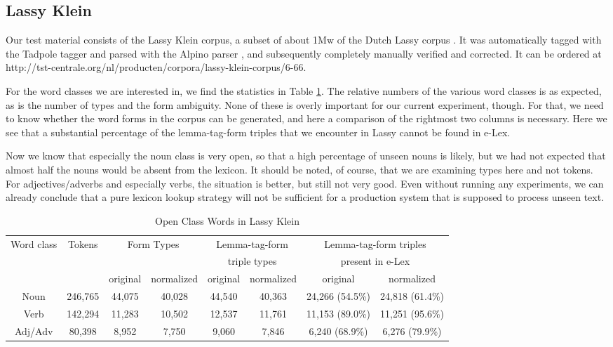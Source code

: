 \documentclass[a4paper,10pt,twoside]{article}
\begin{document}
\subsection{Lassy Klein}
\label{sec_lassy}

Our test material consists of the Lassy Klein corpus, a subset of about 1Mw of the Dutch Lassy corpus \cite{REFlassy}. It was automatically tagged with the Tadpole tagger \cite{REFtadpole} and parsed with the Alpino parser 
\cite{REFalpino,REFalpino2}, 
and subsequently completely manually verified and corrected. It can be ordered at http://tst-centrale.org/nl/producten/corpora/lassy-klein-corpus/6-66. 

For the word classes we are interested in, we find the statistics in Table \ref{tab_lassy}. The relative numbers of the various word classes is as expected, as is the number of types and the form ambiguity. None of these is overly important for our current experiment, though. For that, we need to know whether the word forms in the corpus can be generated, and here a comparison of the rightmost two columns is necessary. Here we see that a substantial percentage of the lemma-tag-form triples that we encounter in Lassy cannot be found in e-Lex. 

Now we know that especially the noun class is very open, so that a high percentage of unseen nouns is likely, but we had not expected that almost half the nouns would be absent from the lexicon. It should be noted, of course, that we are examining types here and not tokens. For adjectives/adverbs and especially verbs, the situation is better, but still not very good. Even without running any experiments, we can already conclude that a pure lexicon lookup strategy will not be sufficient for a production system that is supposed to process unseen text.


\begin{table}[tbh]
\tabcolsep=0.11cm
\begin{center}
\begin{tabular}{|c|c|cc|cc|cc|}
\hline

Word class & Tokens & \multicolumn{2}{|c|}{Form Types} & \multicolumn{2}{|c|}{Lemma-tag-form} & \multicolumn{2}{|c|}{Lemma-tag-form triples} \\
 &  & \multicolumn{2}{|c|}{ } & \multicolumn{2}{|c|}{triple types} & \multicolumn{2}{|c|}{present in e-Lex} \\
 &  & original & normalized & original & normalized & original & normalized \\
\hline
Noun & 246,765 & 44,075 & 40,028 & 44,540 & 40,363 & 24,266 (54.5\%) & 24,818 (61.4\%) \\
Verb & 142,294 & 11,283 & 10,502 & 12,537 & 11,761 & 11,153 (89.0\%) & 11,251 (95.6\%) \\
Adj/Adv & 80,398 & 8,952 & 7,750 & 9,060 & 7,846 & 6,240 (68.9\%) & 6,276 (79.9\%) \\
\hline

\end{tabular}
\caption{Open Class Words in Lassy Klein}
\label{tab_lassy}
\end{center}
\end{table}
\end{document}
